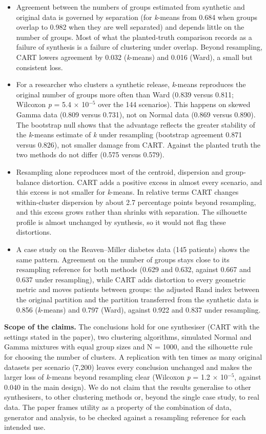 \documentclass[10pt,a4paper]{article}
\begin{document}
\begin{itemize}\setlength{\itemsep}{1pt}\setlength{\topsep}{2pt}
\item Agreement between the numbers of groups estimated from synthetic and original data is governed by separation (for \emph{k}-means from 0.684 when groups overlap to 0.982 when they are well separated) and depends little on the number of groups. Most of what the planted-truth comparison records as a failure of synthesis is a failure of clustering under overlap. Beyond resampling, CART lowers agreement by 0.032 (\emph{k}-means) and 0.016 (Ward), a small but consistent loss.
\item For a researcher who clusters a synthetic release, \emph{k}-means reproduces the original number of groups more often than Ward (0.839 versus 0.811; Wilcoxon \emph{p} = 5.4 $\times$ 10$^{-5}$ over the 144 scenarios). This happens on skewed Gamma data (0.809 versus 0.731), not on Normal data (0.869 versus 0.890). The bootstrap null shows that the advantage reflects the greater stability of the \emph{k}-means estimate of \emph{k} under resampling (bootstrap agreement 0.871 versus 0.826), not smaller damage from CART. Against the planted truth the two methods do not differ (0.575 versus 0.579).
\item Resampling alone reproduces most of the centroid, dispersion and group-balance distortion. CART adds a positive excess in almost every scenario, and this excess is not smaller for \emph{k}-means. In relative terms CART changes within-cluster dispersion by about 2.7 percentage points beyond resampling, and this excess grows rather than shrinks with separation. The silhouette profile is almost unchanged by synthesis, so it would not flag these distortions.
\item A case study on the Reaven–Miller diabetes data (145 patients) shows the same pattern. Agreement on the number of groups stays close to its resampling reference for both methods (0.629 and 0.632, against 0.667 and 0.637 under resampling), while CART adds distortion to every geometric metric and moves patients between groups: the adjusted Rand index between the original partition and the partition transferred from the synthetic data is 0.856 (\emph{k}-means) and 0.797 (Ward), against 0.922 and 0.837 under resampling.
\end{itemize}

\textbf{Scope of the claims.} The conclusions hold for one synthesiser (CART with the settings stated in the paper), two clustering algorithms, simulated Normal and Gamma mixtures with equal group sizes and N = 1000, and the silhouette rule for choosing the number of clusters. A replication with ten times as many original datasets per scenario (7,200) leaves every conclusion unchanged and makes the larger loss of \emph{k}-means beyond resampling clear (Wilcoxon \emph{p} = 1.2 $\times$ 10$^{-5}$, against 0.040 in the main design). We do not claim that the results generalise to other synthesisers, to other clustering methods or, beyond the single case study, to real data. The paper frames utility as a property of the combination of data, generator and analysis, to be checked against a resampling reference for each intended use.
\end{document}
